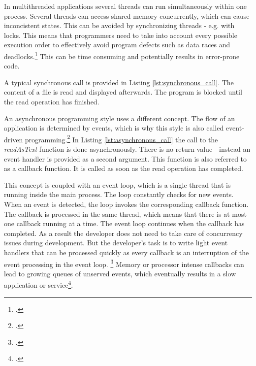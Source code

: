 In multithreaded applications several threads can run simultaneously within one 
process. Several threads can access shared memory concurrently, which can
cause inconcistent states. This can be avoided by synchronizing threads - e.g.
with locks. This means that programmers need to take into account every possible
execution order to effectively avoid program defects such as data races and 
deadlocks.\footcite[Cf.][10]{Breshears_2009}
This can be time consuming and potentially results in error-prone code.

A typical synchronous call is provided in Listing \ref{lst:synchronous_call}. The
content of a file is read and displayed afterwards. The program is blocked until the
read operation has finished.




An asynchronous programming style uses a different concept. The flow of an
application is determined by events, which is why this style is also called
event-driven programming.\footcite[Cf.][16]{teixeira_2012} In Listing \ref{lst:asynchronous_call} the call
to the \textit{readAsText} function is done asynchronously. There is no
return value - instead an event handler is provided as a second argument.
This function is also referred to as a callback function. It is called
as soon as the read operation has completed.



This concept is coupled with an event loop, which is a single thread that is
running inside the main process.
The loop constantly checks for new events. When an event is detected, the loop
invokes the corresponding callback function. The callback is processed in the
same thread, which means that there is at most one callback running at a time.
The event loop continues when the callback has completed. As a result the
developer does not need to take care of concurrency issues during development.
But the developer's task is to write light event handlers that can be processed
quickly as every callback is an interruption of the event processing in the
event loop. \footcite[Cf.][]{Croucher_2010} Memory or processor intense callbacks
can lead to growing queues of unserved events, which eventually results
in a slow application or service\footcite[Cf.][48]{teixeira_2012}.


